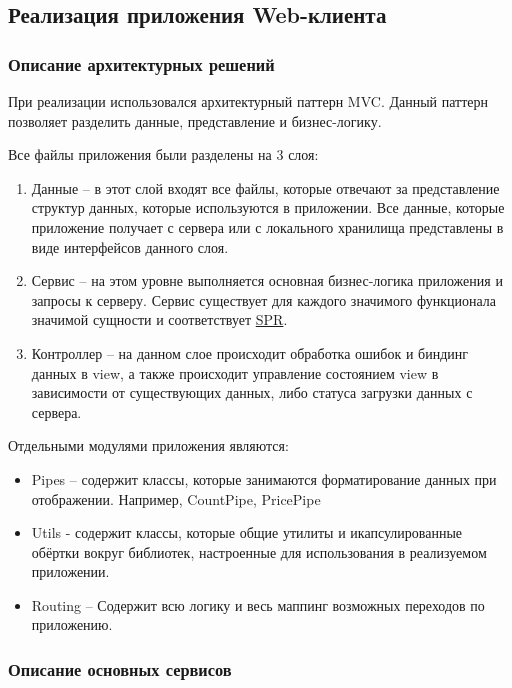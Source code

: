 \subsection{Реализация приложения Web-клиента}\label{subsec:3-impl-web}\indent

\subsubsection{Описание архитектурных решений}\indent

При реализации использовался архитектурный паттерн MVC. Данный паттерн позволяет разделить данные, представление и бизнес-логику.

Все файлы приложения были разделены на 3 слоя:
\begin{enumerate}
    \item Данные – в этот слой входят все файлы, которые отвечают за представление структур данных, которые используются в приложении.
    Все данные, которые приложение получает с сервера или с локального хранилища представлены в виде интерфейсов данного слоя.
    \item Сервис – на этом уровне выполняется основная бизнес-логика приложения и запросы к серверу.
    Сервис существует для каждого значимого функционала значимой сущности и соответствует \hyperlink{gloss:spr}{SPR}.
    \item Контроллер – на данном слое происходит обработка ошибок и биндинг данных в view, а также происходит управление состоянием view в зависимости от существующих данных, либо статуса загрузки данных с сервера.
\end{enumerate}

Отдельными модулями приложения являются:
\begin{itemize}
    \item Pipes – содержит классы, которые занимаются форматирование данных при отображении.
    Например, CountPipe, PricePipe
    \item Utils - содержит классы, которые общие утилиты и икапсулированные обёртки вокруг библиотек, настроенные для использования в реализуемом приложении.
    \item Routing – Содержит всю логику и весь маппинг возможных переходов по приложению.
\end{itemize}

\subsubsection{Описание основных сервисов}\indent

